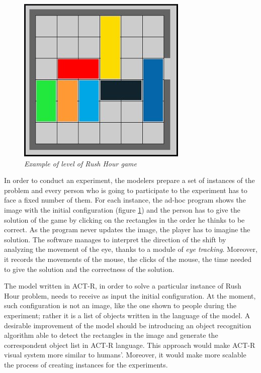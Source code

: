 	\begin{figure}[!h]
	  \begin{center} 
	    \includegraphics[scale=0.6]{images/ch_03/originale.jpg}	
	  \end{center} 
	  \caption{\textit{Example of level of Rush Hour game}}
	  \label{fig:RushHourHuman}	
  	\end{figure}
	
	In order to conduct an experiment, the modelers prepare a set of instances of the problem and every person who is going to participate to the experiment has to face a fixed number of them.
	For each instance, the ad-hoc program shows the image with the initial configuration (figure \ref{fig:RushHourHuman}) and the person has to give the solution of the game by clicking on the rectangles in the order he thinks to be correct. As the program never updates the image, the player has to imagine the solution. The software manages to interpret the direction of the shift by analyzing the movement of the eye, thanks to a module of \emph{eye tracking}. Moreover, it records the movements of the mouse, the clicks of the mouse, the time needed to give the solution and the correctness of the solution. 

	The model written in ACT-R, in order to solve a particular instance of Rush Hour problem, needs to receive as input the initial configuration. At the moment, such configuration is not an image, like the one shown to people during the experiment; rather it is a list of objects written in the language of the model.
	A desirable improvement of the model should be introducing an object recognition algorithm able to detect the rectangles in the image and generate the correspondent object list in ACT-R language. 
	This approach would make ACT-R visual system more similar to humans'. Moreover, it would make more scalable the process of creating instances for the experiments. 


